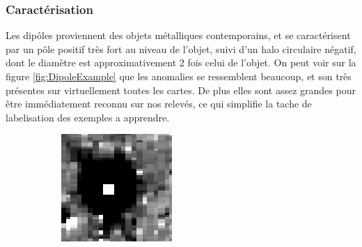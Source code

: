 \documentclass[a4paper, 12pt, titlepage, oneside, french]{article}
\begin{document}
	\subsubsection{Caractérisation}
	Les dipôles proviennent des objets métalliques contemporains, et se caractérisent par un pôle positif très fort au niveau de l'objet, suivi d'un halo circulaire négatif, dont le diamètre est approximativement 2 fois celui de l'objet. On peut voir sur la figure \ref{fig:DipoleExample} que les anomalies se ressemblent beaucoup, et son très présentes sur virtuellement toutes les cartes. De plus elles sont assez grandes pour être immédiatement reconnu sur nos relevés, ce qui simplifie la tache de labelisation des exemples a apprendre. 
	\begin{figure}[]%
		\centering
		\begin{subfigure}[b]{0.3\linewidth}
			\includegraphics[width=\linewidth]{DipoleExemple1.png}
		\end{subfigure}
		\begin{subfigure}[b]{0.3\linewidth}

\end{subfigure}
\end{figure}
\end{document}

